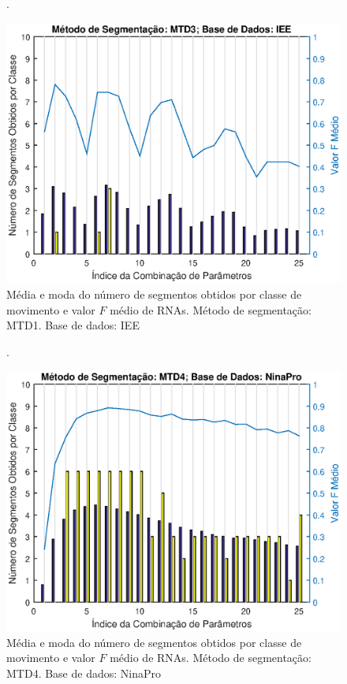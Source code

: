 \begin{figure}[htb]
	\caption{\label{fig:mtd3Iee}Média e moda do número de segmentos obtidos por classe de movimento e valor $F$ médio de RNAs. Método de segmentação: MTD1. Base de dados: IEE}.
	\begin{center}
	    \includegraphics[width=0.75\linewidth]{./img/matlab/results/mtd3_iee.eps}
	\end{center}
\end{figure}

\begin{figure}[htb]
	\caption{\label{fig:mtd4Nina}Média e moda do número de segmentos obtidos por classe de movimento e valor $F$ médio de RNAs. Método de segmentação: MTD4. Base de dados: NinaPro}.
	\begin{center}
	    \includegraphics[width=0.75\linewidth]{./img/matlab/results/mtd4_nina.eps}
	\end{center}
\end{figure}

